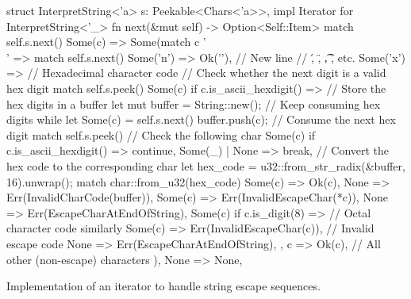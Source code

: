 \documentclass[../00-main.tex]{subfiles}
\begin{document}
\begin{listing}[!t]
  \begin{RustListing}
    struct InterpretString<'a> {
        s: Peekable<Chars<'a>>,
    }
    impl Iterator for InterpretString<'_> {
        fn next(&mut self) -> Option<Self::Item> {
            match self.s.next() {
                Some(c) => Some(match c {
                    '\\' => match self.s.next() {
                        Some('n') => Ok('\n'),  // New line
                        // \', \", \t, \r, etc.
                        Some('x') => { // Hexadecimal character code
                            // Check whether the next digit is a valid hex digit
                            match self.s.peek() {
                                Some(c) if c.is_ascii_hexdigit() => {
                                    // Store the hex digits in a buffer
                                    let mut buffer = String::new();
                                    // Keep consuming hex digits
                                    while let Some(c) = self.s.next() {
                                        buffer.push(c); // Consume the next hex digit
                                        match self.s.peek() { // Check the following char
                                            Some(c) if c.is_ascii_hexdigit() => continue,
                                            Some(_) | None => break,
                                        }
                                    }
                                    // Convert the hex code to the corresponding char
                                    let hex_code = u32::from_str_radix(&buffer, 16).unwrap();
                                    match char::from_u32(hex_code) {
                                        Some(c) => Ok(c),
                                        None => Err(InvalidCharCode(buffer)),
                                    }
                                }
                                Some(c) => Err(InvalidEscapeChar(*c)),
                                None => Err(EscapeCharAtEndOfString),
                            }
                        }
                        Some(c) if c.is_digit(8) => {} // Octal character code similarly
                        Some(c) => Err(InvalidEscapeChar(c)), // Invalid escape code
                        None => Err(EscapeCharAtEndOfString),
                    },
                    c => Ok(c), // All other (non-escape) characters
                }),
                None => None,
            }
        }
    }
  \end{RustListing}
  \caption{Implementation of an iterator to handle string escape sequences.}
  \label{app:lst:string escape iterator}
\end{listing}
\end{document}
